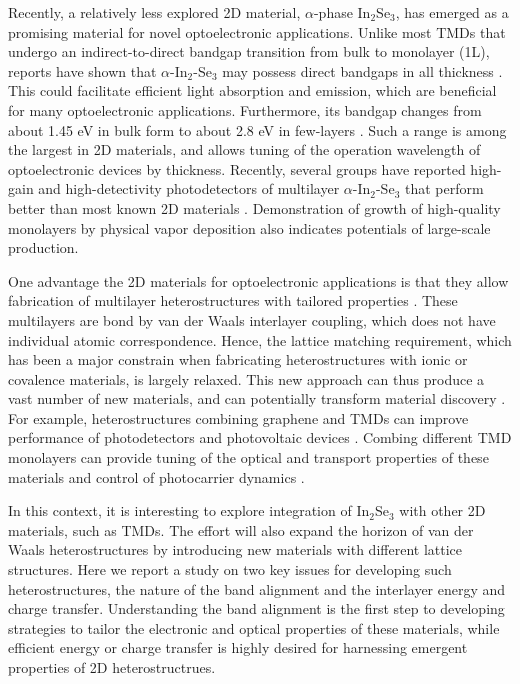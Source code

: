 \documentclass[journal=jacsat,manuscript=article]{achemso}
\begin{document}
Recently, a relatively less explored 2D material, $\alpha$-phase In$_2$Se$_3$, has emerged as a promising material for novel optoelectronic applications. Unlike most TMDs that undergo an indirect-to-direct bandgap transition from bulk to monolayer (1L), reports have shown that $\alpha$-In$_2$-Se$_3$ may possess direct bandgaps in all thickness \cite{aom41939}. This could facilitate efficient light absorption and emission, which are beneficial for many optoelectronic applications. Furthermore, its bandgap changes from about 1.45 eV in bulk form to about 2.8 eV in few-layers \cite{aom41939}. Such a range is among the largest in 2D materials, and allows tuning of the operation wavelength of optoelectronic devices by thickness. Recently, several groups have reported high-gain and high-detectivity photodetectors of multilayer $\alpha$-In$_2$-Se$_3$ that perform better than most known 2D materials \cite{nl157853,acsnano8514,nl156400}. Demonstration of growth of high-quality monolayers by physical vapor deposition \cite{nl156400} also indicates potentials of large-scale production.

One advantage the 2D materials for optoelectronic applications is that they allow fabrication of multilayer heterostructures with tailored properties \cite{n499419}. These multilayers are bond by van der Waals interlayer coupling, which does not have individual atomic correspondence. Hence, the lattice matching requirement, which has been a major constrain when fabricating heterostructures with ionic or covalence materials, is largely relaxed. This new approach can thus produce a vast number of new materials, and can potentially transform material discovery \cite{nrm116042,s353461}. For example, heterostructures combining graphene and TMDs can improve performance of photodetectors \cite{nn8952,acsnano108252,nc713278} and photovoltaic devices \cite{s3401311,nn8952}. Combing different TMD monolayers can provide tuning of the optical and transport properties of these materials \cite{nc67666,pnas1116198,nl17938,nl164831} and control of photocarrier dynamics \cite{nn9682,acsnano812717,nc66242,nl175229,nn9676,nl17638}.

In this context, it is interesting to explore integration of In$_2$Se$_3$ with other 2D materials, such as TMDs. The effort will also expand the horizon of van der Waals heterostructures by introducing new materials with different lattice structures. Here we report a study on two key issues for developing such heterostructures, the nature of the band alignment and the interlayer energy and charge transfer. Understanding the band alignment is the first step to developing strategies to tailor the electronic and optical properties of these materials, while efficient energy or charge transfer is highly desired for harnessing emergent properties of 2D heterostructrues.
\end{document}

